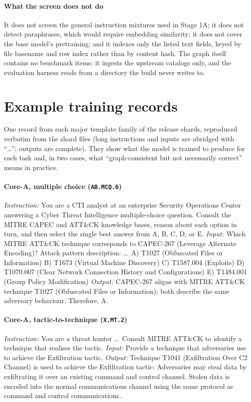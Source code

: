 \documentclass[11pt,a4paper]{article}
\begin{document}
\paragraph{What the screen does not do}
It does not screen the general instruction mixtures used in Stage 1A; it does not detect paraphrases, which would require embedding similarity; it does not cover the base model's pretraining; and it indexes only the listed text fields, keyed by file basename and row index rather than by content hash. The graph itself contains no benchmark items: it ingests the upstream catalogs only, and the evaluation harness reads from a directory the build never writes to.

\section{Example training records}\label{app:examples}
One record from each major template family of the release shards, reproduced verbatim from the shard files (long instructions and inputs are abridged with ``\ldots''; outputs are complete). They show what the model is trained to produce for each task and, in two cases, what ``graph-consistent but not necessarily correct'' means in practice.

\paragraph{Core-A, multiple choice (\texttt{AB.MCQ.6})}
\emph{Instruction:} You are a CTI analyst at an enterprise Security Operations Center answering a Cyber Threat Intelligence multiple-choice question. Consult the MITRE CAPEC and ATT\&CK knowledge bases, reason about each option in turn, and then select the single best answer from A, B, C, D, or E.
\emph{Input:} Which MITRE ATT\&CK technique corresponds to CAPEC-267 (Leverage Alternate Encoding)? Attack pattern description: \ldots\ A) T1027 (Obfuscated Files or Information) B) T1673 (Virtual Machine Discovery) C) T1587.004 (Exploits) D) T1070.007 (Clear Network Connection History and Configurations) E) T1484.001 (Group Policy Modification)
\emph{Output:} CAPEC-267 aligns with MITRE ATT\&CK technique T1027 (Obfuscated Files or Information); both describe the same adversary behaviour. Therefore, A.

\paragraph{Core-A, tactic-to-technique (\texttt{X.MT.2})}
\emph{Instruction:} You are a threat hunter \ldots\ Consult MITRE ATT\&CK to identify a technique that realises the tactic.
\emph{Input:} Provide a technique that adversaries use to achieve the Exfiltration tactic.
\emph{Output:} Technique T1041 (Exfiltration Over C2 Channel) is used to achieve the Exfiltration tactic: Adversaries may steal data by exfiltrating it over an existing command and control channel. Stolen data is encoded into the normal communications channel using the same protocol as command and control communications..
\end{document}
